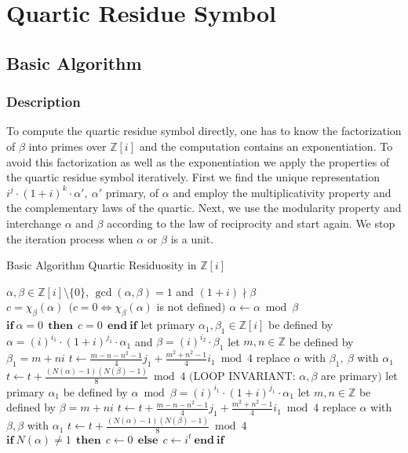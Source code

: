 \documentclass[a4paper, 11pt]{article}
\begin{document}
 
 
 
 \section{Quartic Residue Symbol} 
 
 \subsection{Basic Algorithm} 
 \subsubsection{Description} 
 To compute the quartic residue symbol directly, one has to know the factorization of $\beta$ into primes over $\mathbb{Z}[{i}]$ and the computation contains an exponentiation. To avoid this factorization as well as the exponentiation we apply the properties of the quartic residue symbol iteratively. 
 First we find the unique representation $ i^j \cdot (1+i)^k \cdot \alpha', ~\alpha'$ primary, of $\alpha$ and employ the multiplicativity property and the complementary laws of the quartic. 
 Next, we use the modularity property and interchange $\alpha$ and $\beta$ according to the law of 
 reciprocity and start again. We stop the iteration process when $\alpha$ or $\beta$ is a unit.  
 
 \begin{algorithm}[htb] 
 \caption{Basic Algorithm Quartic Residuosity in $\mathbb{Z}[{i}]$} 
 \label{alg1} 
 \begin{algorithmic}[1] 
 \REQUIRE $\alpha,\beta \in \mathbb{Z}[{i}] \setminus \{0\}$, $\gcd(\alpha,\beta)=1$ 
 and $(1 + i) \nmid \beta$\\ 
 \ENSURE $c = \chi_{\beta}(\alpha)~~(c=0 \Leftrightarrow \chi_{\beta}(\alpha)$ is not defined$)$ 
 \STATE $\alpha \gets \alpha \bmod \beta~$ 
 \STATE $\mathbf{if} ~\alpha = 0 \mathbf{~~then~}~c=0~\mathbf{~end ~if}$ 
 \STATE let primary $\alpha_1, \beta_1 \in \mathbb{Z}[{i}]$ be defined by\newline 
     $\alpha = (i)^{i_1} \cdot (1 + i)^{j_1}\cdot \alpha_1$ and\newline 
     $ \beta = (i)^{i_2} \cdot \beta_1$ 
 \STATE let $m, n \in \mathbb{Z}$ be defined by $\beta_1 = m + ni$ 
 \STATE $t\gets {\frac{m-n-n^{2}-1}{4}} {j_1}  +  {\frac{m^{2}+ n^{2} - 1}{4}}{i_1} \bmod 4$ 
 \STATE replace $\alpha$ with $\beta_1, ~\beta$ with $\alpha_1$ 
 \STATE $t \gets t +  \frac{(N(\alpha)-1)(N(\beta)-1)}{8}\bmod 4$ 
 \STATE $($LOOP INVARIANT: $\alpha, \beta$ are primary$)$ 
 \STATE let primary $\alpha_1$ be defined by $\alpha \bmod \beta = (i)^{i_1}\cdot (1 + i)^{j_1}\cdot \alpha_1$ 
 \STATE let $m, n \in \mathbb{Z}$ be defined by $\beta = m + ni$ 
 \STATE $t\gets t + {\frac{m-n-n^{2}-1}{4}} {j_1}  +  {\frac{m^{2}+ n^{2} - 1}{4}}{i_1} \bmod 4$ 
 \STATE replace $\alpha$ with $\beta, \beta$ with $\alpha_1$ 
 \STATE $t \gets t +  \frac{(N(\alpha)-1)(N(\beta)-1)}{8}\bmod 4$ 
 \ENDWHILE 
 \STATE $\mathbf{if} { ~N(\alpha) \ne 1 }  \mathbf{~~then~}~c \gets 0~\mathbf{~else~~} c \gets i^t ~\mathbf{end~ if}$ 
 
 \end{algorithmic} 
 \end{algorithm} 
 
\end{document}
